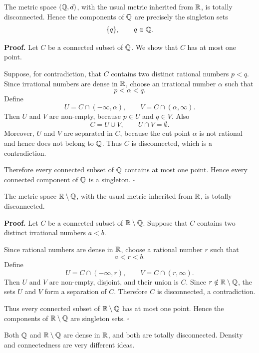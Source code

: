 \documentclass[12pt, a4paper]{article}
\begin{document}
\clearpage

\begin{theorem}
The metric space $(\mathbb{Q},d)$, with the usual metric inherited from $\mathbb{R}$, is totally disconnected. Hence the components of $\mathbb{Q}$ are precisely the singleton sets
\[
    \{q\},\qquad q\in\mathbb{Q}.
\]
\end{theorem}

\textbf{Proof.}
Let $C$ be a connected subset of $\mathbb{Q}$. We show that $C$ has at most one point.

Suppose, for contradiction, that $C$ contains two distinct rational numbers $p<q$. Since irrational numbers are dense in $\mathbb{R}$, choose an irrational number $\alpha$ such that
\[
    p<\alpha<q.
\]
Define
\[
    U=C\cap(-\infty,\alpha),
    \qquad
    V=C\cap(\alpha,\infty).
\]
Then $U$ and $V$ are non-empty, because $p\in U$ and $q\in V$. Also
\[
    C=U\cup V,
    \qquad
    U\cap V=\emptyset.
\]
Moreover, $U$ and $V$ are separated in $C$, because the cut point $\alpha$ is not rational and hence does not belong to $\mathbb{Q}$.
Thus $C$ is disconnected, which is a contradiction.

Therefore every connected subset of $\mathbb{Q}$ contains at most one point. Hence every connected component of $\mathbb{Q}$ is a singleton. \hfill $\square$

\clearpage

\begin{theorem}
The metric space $\mathbb{R}\setminus\mathbb{Q}$, with the usual metric inherited from $\mathbb{R}$, is totally disconnected.
\end{theorem}

\textbf{Proof.}
Let $C$ be a connected subset of $\mathbb{R}\setminus\mathbb{Q}$. Suppose that $C$ contains two distinct irrational numbers $a<b$.

Since rational numbers are dense in $\mathbb{R}$, choose a rational number $r$ such that
\[
    a<r<b.
\]
Define
\[
    U=C\cap(-\infty,r),
    \qquad
    V=C\cap(r,
    \infty).
\]
Then $U$ and $V$ are non-empty, disjoint, and their union is $C$. Since $r\notin \mathbb{R}\setminus\mathbb{Q}$, the sets $U$ and $V$ form a separation of $C$. Therefore $C$ is disconnected, a contradiction.

Thus every connected subset of $\mathbb{R}\setminus\mathbb{Q}$ has at most one point. Hence the components of $\mathbb{R}\setminus\mathbb{Q}$ are singleton sets. \hfill $\square$

\vfill

\begin{problem}[Remark]
Both $\mathbb{Q}$ and $\mathbb{R}\setminus\mathbb{Q}$ are dense in $\mathbb{R}$, and both are totally disconnected. Density and connectedness are very different ideas.
\end{problem}
\end{document}
